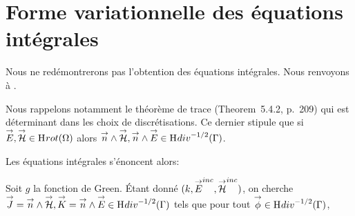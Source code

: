 


\section{Forme variationnelle des équations intégrales}

  Nous ne redémontrerons pas l'obtention des équations intégrales. Nous renvoyons à \cite[Section~5.5, p.~234]{nedelec_acoustic_2001}.

  Nous rappelons notamment le théorème de trace (Theorem~5.4.2, p.~209) qui est déterminant dans les choix de discrétisations. Ce dernier stipule que si \(\vE,\vH \in \Sobolev[rot]{(\Omega)}\) alors \(\vn \pvect \vH,\vn \pvect \vE \in \Sobolev[div]^{-1/2}{(\Gamma)}\). 

  Les équations intégrales s'énoncent alors:

  Soit \(g\) la fonction de Green. Étant donné \((k,\vE^{inc},\vH^{inc})\), on cherche \(\vJ = \vn \pvect \vH, \vK = \vn \pvect \vE \in \Sobolev[div]^{-1/2}{(\Gamma)}\)  tels que pour tout \(\vect{\phi} \in \Sobolev[div]^{-1/2}(\Gamma)\),

